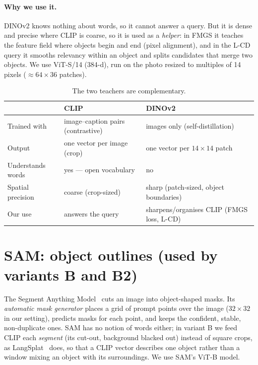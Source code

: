 \documentclass[11pt,a4paper]{article}
\begin{document}
\paragraph{Why we use it.} DINOv2 knows nothing about words, so it cannot answer a query. But it is dense and
precise where CLIP is coarse, so it is used as a \emph{helper}: in FMGS it teaches the feature field where objects
begin and end (pixel alignment), and in the L-CD query it smooths relevancy within an object and splits candidates
that merge two objects. We use ViT-S/14 (384-d), run on the photo resized to multiples of 14 pixels
($\approx64\times36$ patches).

\begin{table}[ht]
\centering\small
\begin{tabularx}{\linewidth}{@{}lLL@{}}
\toprule
 & CLIP & DINOv2 \\
\midrule
Trained with & image--caption pairs (contrastive) & images only (self-distillation) \\
Output & one vector per image (crop) & one vector per $14\times14$ patch \\
Understands words & yes --- open vocabulary & no \\
Spatial precision & coarse (crop-sized) & sharp (patch-sized, object boundaries) \\
Our use & answers the query & sharpens/organises CLIP (FMGS loss, L-CD) \\
\bottomrule
\end{tabularx}
\caption{The two teachers are complementary.}
\end{table}

\section{SAM: object outlines (used by variants B and B2)}

The Segment Anything Model~\cite{sam} cuts an image into object-shaped masks. Its \emph{automatic mask generator}
places a grid of prompt points over the image ($32\times32$ in our setting), predicts masks for each point, and keeps
the confident, stable, non-duplicate ones. SAM has no notion of words either; in variant B we feed CLIP each
\emph{segment} (its cut-out, background blacked out) instead of square crops, as LangSplat~\cite{langsplat} does, so
that a CLIP vector describes one object rather than a window mixing an object with its surroundings. We use SAM's
ViT-B model.
\end{document}
